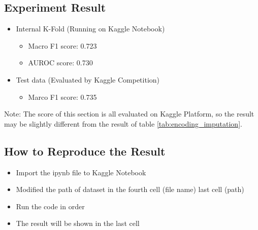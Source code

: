 \documentclass[a4paper, oneside, final, 12pt]{scrartcl} %
\begin{document}
\subsection{Experiment Result}

\begin{itemize}
  \item Internal K-Fold (Running on Kaggle Notebook)
  \begin{itemize}
    \item Macro F1 score: 0.723
    \item AUROC score: 0.730
  \end{itemize}
  \item Test data (Evaluated by Kaggle Competition)
  \begin{itemize}
    \item Marco F1 score: 0.735
  \end{itemize}
\end{itemize}

Note: The score of this section is all evaluated on Kaggle Platform,
so the result may be slightly different from the result of table \ref{tab:encoding_imputation}.

\subsection{How to Reproduce the Result}

\begin{itemize}
  \item Import the ipynb file to Kaggle Notebook
  \item Modified the path of dataset in the fourth cell (file name) last cell (path)
  \item Run the code in order
  \item The result will be shown in the last cell
\end{itemize}

\endgroup

\end{document}
